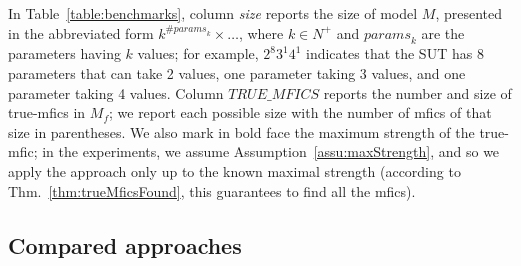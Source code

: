 \documentclass[
12pt, %
oneside, %
english, %
singlespacing, %
headsepline, %
consistentlayout, %
]{MastersDoctoralThesis} %
\newcommand{\truemfic}{true-\textsf{mfic}\xspace}
\newcommand{\truemfics}{true-\textsf{mfics}\xspace}
\newcommand{\mfics}{\textsf{mfics}\xspace}
\newcommand{\trueMficsSet}{\ensuremath{\mathit{TRUE\_MFICS}}\xspace}
\theoremstyle{plain}
\theoremstyle{definition}
\theoremstyle{remark}
\theoremstyle{plain}
\theoremstyle{plain}
\theoremstyle{remark}
\begin{document}
In Table~\ref{table:benchmarks}, column \textit{size} reports the size of model $M$, presented in the abbreviated form $k^{\# \mathit{params}_k} \times \ldots$, where $k$$\in$$N^+$ and $\mathit{params}_k$ are the parameters having $k$ values; for example, $2^8$$3^1$$4^1$ indicates that the SUT has 8 parameters that can take 2 values, one parameter taking 3 values, and one parameter taking 4 values. Column \trueMficsSet reports the number and size of \truemfics in $M_f$; we report each possible size with the number of \mfics of that size in parentheses. We also mark in bold face the maximum strength of the \truemfic; in the experiments, we assume Assumption~\ref{assu:maxStrength}, and so we apply the approach only up to the known maximal strength (according to Thm.~\ref{thm:trueMficsFound}, this guarantees to find all the \mfics).


\subsection{Compared approaches}\label{sec:processes}
\end{document}
